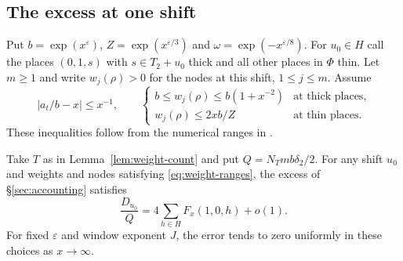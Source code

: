 \subsection{The excess at one shift}

Put $b=\exp(x^\varepsilon)$, $Z=\exp(x^{\varepsilon/3})$ and
$\omega=\exp(-x^{\varepsilon/8})$. For $u_0\in H$ call the places
$(0,1,s)$ with $s\in T_2+u_0$ thick and all other places in $\Phi$
thin. Let $m\ge1$ and write $w_j(\rho)>0$ for the nodes at this shift,
$1\le j\le m$. Assume
\begin{equation}\label{eq:weight-ranges}
  |a_t/b-x|\le x^{-1},\qquad
  \begin{cases}
    b\le w_j(\rho)\le b(1+x^{-2}) & \text{at thick places},\\
    w_j(\rho)\le 2xb/Z & \text{at thin places}.
  \end{cases}
\end{equation}
These inequalities follow from the numerical ranges in
\citep[Theorem~A(i) and Proposition~5.16]{adriazola-grh}.

\begin{proposition}\label{prop:one-shift}
Take $T$ as in Lemma~\ref{lem:weight-count} and put
$Q=N_Tmb\delta_2/2$. For any shift $u_0$ and weights and nodes
satisfying \eqref{eq:weight-ranges}, the excess of
\S\ref{sec:accounting} satisfies
\begin{equation}\label{eq:one-shift}
  \frac{D_{u_0}}{Q}=4\sum_{h\in H}F_x(1,0,h)+o(1).
\end{equation}
For fixed $\varepsilon$ and window exponent $J$, the error tends to
zero uniformly in these choices as $x\to\infty$.
\end{proposition}


